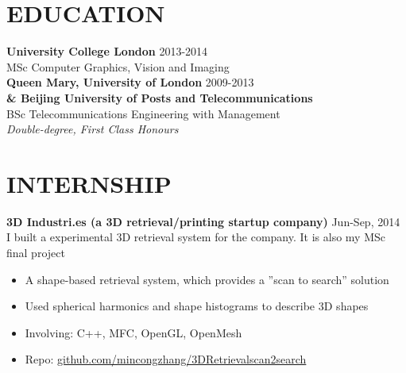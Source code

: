 \documentclass[line,margin]{res}
\begin{document}
\address{}
\address{}

\begin{resume}
\section{EDUCATION} 
{\bf University College London} \hfill{\textcolor[rgb]{0.7,0.7,0.7}{2013-2014}}\\
MSc Computer Graphics, Vision and Imaging  \\

{\bf Queen Mary, University of London} \hfill{\textcolor[rgb]{0.7,0.7,0.7}{2009-2013}}\\
{\bf \& Beijing University of Posts and Telecommunications}\\
BSc Telecommunications Engineering with Management\\
\emph{Double-degree, First Class Honours} \\

\section{INTERNSHIP} 
\renewcommand{\labelitemi}{-}

{\bf 3D Industri.es (a 3D retrieval/printing startup company)}
\hfill{\textcolor[rgb]{0.7,0.7,0.7}{Jun-Sep, 2014}}\\
I built a experimental 3D retrieval system for the company. It is also my MSc final project
\begin{itemize}\itemsep -2pt %
    \item A shape-based retrieval system, which provides a ”scan to search” solution
    \item Used spherical harmonics and shape histograms to describe 3D shapes
    \item Involving: C++, MFC, OpenGL, OpenMesh
    \item Repo: \href{https://github.com/mincongzhang/3D\textunderscore Retrieval\textunderscore scan2search}{github.com/mincongzhang/3D\textunderscore  Retrieval\textunderscore scan2search}
\end{itemize}


\end{resume}
\end{document}
